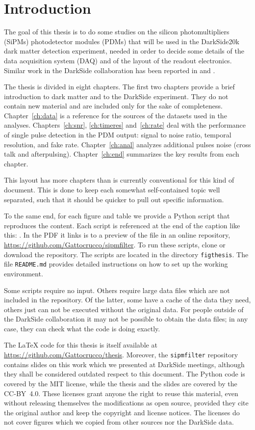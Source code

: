 \chapter*{Introduction}

The goal of this thesis is to do some studies on the silicon photomultipliers
(SiPMs) photodetector modules (PDMs) that will be used in the DarkSide20k dark
matter detection experiment, needed in order to decide some details of the data
acquisition system (DAQ) and of the layout of the readout electronics. Similar
work in the DarkSide collaboration has been reported in
\cite[ch.~3, 5]{savarese2018} and \cite[ch.~5, 6]{luzzi2020}.

The thesis is divided in eight chapters. The first two chapters provide a brief
introduction to dark matter and to the DarkSide experiment. They do not contain
new material and are included only for the sake of completeness.
Chapter~\ref{ch:data} is a reference for the sources of the datasets used in
the analyses. Chapters~\ref{ch:snr}, \ref{ch:timeres} and~\ref{ch:rate} deal
with the performance of single pulse detection in the PDM output: signal to
noise ratio, temporal resolution, and fake rate. Chapter~\ref{ch:anal}
analyzes additional pulses noise (cross talk and afterpulsing).
Chapter~\ref{ch:end} summarizes the key results from each chapter.

This layout has more chapters than is currently conventional for this kind of
document. This is done to keep each somewhat self-contained topic well
separated, such that it should be quicker to pull out specific information.

To the same end, for each figure and table we provide a Python script that
reproduces the content. Each script is referenced at the end of the caption
like this: . In the PDF it links is to a preview of the
file in an online repository, \url{https://github.com/Gattocrucco/sipmfilter}.
To run these scripts, clone or download the repository. The scripts are located
in the directory \nolinkurl{figthesis}. The file \nolinkurl{README.md} provides
detailed instructions on how to set up the working environment.

Some scripts require no input. Others require large data files which are not
included in the repository. Of the latter, some have a cache of the data they
need, others just can not be executed without the original data. For people
outside of the DarkSide collaboration it may not be possible to obtain the data
files; in any case, they can check what the code is doing exactly.

The \LaTeX{} code for this thesis is itself available at
\url{https://github.com/Gattocrucco/thesis}. Moreover, the
\nolinkurl{sipmfilter} repository contains slides on this work which we
presented at DarkSide meetings, although they shall be considered outdated
respect to this document. The Python code is covered by the MIT license, while
the thesis and the slides are covered by the CC-BY~4.0. These licenses grant
anyone the right to reuse this material, even without releasing themselves the
modifications as open source, provided they cite the original author and keep
the copyright and license notices. The licenses do not cover figures which we
copied from other sources nor the DarkSide data.
